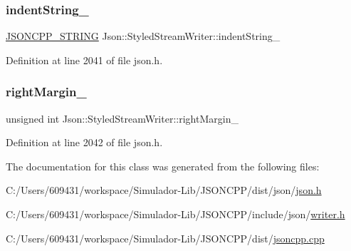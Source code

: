 \hypertarget{class_json_1_1_styled_stream_writer_a1481433ebe1491ea83b0beb92aed56c2}{}\label{class_json_1_1_styled_stream_writer_a1481433ebe1491ea83b0beb92aed56c2} 
\subsubsection{\texorpdfstring{indent\+String\+\_\+}{indentString\_}}
{\footnotesize\ttfamily \hyperlink{config_8h_a1e723f95759de062585bc4a8fd3fa4be}{J\+S\+O\+N\+C\+P\+P\+\_\+\+S\+T\+R\+I\+NG} Json\+::\+Styled\+Stream\+Writer\+::indent\+String\+\_\+\hspace{0.3cm}{\ttfamily [private]}}



Definition at line 2041 of file json.\+h.

\hypertarget{class_json_1_1_styled_stream_writer_a94299ec0a9bb925b2dbbab7c1f2b390a}{}\label{class_json_1_1_styled_stream_writer_a94299ec0a9bb925b2dbbab7c1f2b390a} 
\subsubsection{\texorpdfstring{right\+Margin\+\_\+}{rightMargin\_}}
{\footnotesize\ttfamily unsigned int Json\+::\+Styled\+Stream\+Writer\+::right\+Margin\+\_\+\hspace{0.3cm}{\ttfamily [private]}}



Definition at line 2042 of file json.\+h.



The documentation for this class was generated from the following files\+:\begin{DoxyCompactItemize}
\item 
C\+:/\+Users/609431/workspace/\+Simulador-\/\+Lib/\+J\+S\+O\+N\+C\+P\+P/dist/json/\hyperlink{dist_2json_2json_8h}{json.\+h}\item 
C\+:/\+Users/609431/workspace/\+Simulador-\/\+Lib/\+J\+S\+O\+N\+C\+P\+P/include/json/\hyperlink{writer_8h}{writer.\+h}\item 
C\+:/\+Users/609431/workspace/\+Simulador-\/\+Lib/\+J\+S\+O\+N\+C\+P\+P/dist/\hyperlink{jsoncpp_8cpp}{jsoncpp.\+cpp}\end{DoxyCompactItemize}
